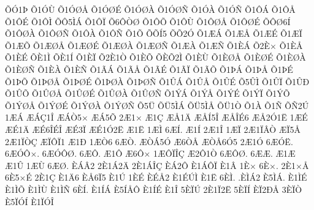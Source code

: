 {^^d5^^d31^^de
^^d51^^d3^^d9
^^d51^^d3^^d8^^c5
^^d51^^d3^^d8^^c9
^^d51^^d3^^d8^^c0
^^d51^^d3^^d8^^d1
^^d51^^d3^^c0
^^d51^^d3^^d1
^^d51^^d4^^c1
^^d51^^d4^^c5
^^d51^^d4^^c9
^^d51^^d4^^cc
^^d5^^d45^^cc^^c1
^^d51^^d4^^cf
^^d56^^d4^^d2^^d8
^^d51^^d4^^d5
^^d51^^d4^^d9
^^d51^^d4^^d8^^c5
^^d51^^d4^^d8^^c9
^^d5^^d4^^d86^^cd
^^d51^^d4^^d8^^c0
^^d51^^d4^^d8^^d1
^^d51^^d4^^c0
^^d51^^d4^^d1
^^d51^^d5
^^d5^^d5^^cd5
^^d5^^d52^^d3
^^d51^^c6^^c1
^^d51^^c6^^c5
^^d51^^c6^^c9
^^d51^^c6^^cf
^^d51^^c6^^d5
^^d51^^c6^^d8^^c5
^^d51^^c6^^d8^^c9
^^d51^^c6^^d8^^c0
^^d51^^c6^^d8^^d1
^^d51^^c6^^c0
^^d51^^c6^^d1
^^d51^^c8^^c1
^^d52^^c8^^d7
^^d51^^c8^^c5
^^d51^^c8^^c9
^^d5^^c81^^cc
^^d5^^c81^^cd
^^d51^^c8^^cf
^^d52^^c81^^d2
^^d51^^c8^^d5
^^d5^^c8^^d52^^cc
^^d51^^c8^^d9
^^d51^^c8^^d8^^c5
^^d51^^c8^^d8^^c9
^^d51^^c8^^d8^^c0
^^d51^^c8^^d8^^d1
^^d51^^c8^^c0
^^d51^^c8^^d1
^^d51^^c3^^c1
^^d51^^c3^^c5
^^d51^^c3^^c9
^^d51^^c3^^cf
^^d51^^c3^^d5
^^d51^^de^^c1
^^d51^^de^^c5
^^d51^^de^^c9
^^d51^^de^^d5
^^d51^^de^^d8^^c5
^^d51^^de^^d8^^c9
^^d51^^de^^d8^^c0
^^d51^^de^^d8^^d1
^^d51^^db^^c1
^^d51^^db^^c5
^^d51^^db^^c9
^^d55^^db^^cc
^^d51^^db^^cf
^^d51^^db^^d0
^^d51^^db^^d5
^^d51^^db^^d8^^c5
^^d51^^db^^d8^^c9
^^d51^^db^^d8^^c0
^^d51^^db^^d8^^d1
^^d51^^dd^^c1
^^d51^^dd^^c5
^^d51^^dd^^c9
^^d51^^dd^^cf
^^d51^^dd^^d5
^^d51^^dd^^d8^^c5
^^d51^^dd^^d8^^c9
^^d51^^dd^^d8^^c0
^^d51^^dd^^d8^^d1
^^d55^^dc
^^d5^^dc5^^cc^^c1
^^d5^^dc5^^cc^^c5
^^d5^^dc1^^d2
^^d51^^c0
^^d51^^d1
^^d5^^d12^^da
1^^c6^^c1
^^c6^^c1^^c71^^ce
^^c6^^c1^^d25^^d7
^^c6^^c15^^d5
2^^c61^^d7
^^c61^^c7
^^c6^^c51^^c4
^^c6^^c5^^cd5^^ce
^^c6^^c5^^ce^^c96
^^c6^^c52^^d31^^cb
1^^c6^^c9
^^c6^^c91^^c4
^^c6^^c96^^ce^^c9^^ce
^^c6^^c93^^cf
^^c6^^c91^^d32^^cb
^^c61^^cb
1^^c6^^cc
6^^c6^^cd.
^^c61^^cd
2^^c61^^ce
1^^c6^^cf
2^^c61^^cf^^c2^^d2
^^c6^^cf5^^c5
2^^c61^^cf^^d2^^c7
^^c6^^cf^^d4^^cf1
^^c61^^d0
1^^c6^^d26
6^^c6^^d2.
^^c6^^d2^^c15^^d3
^^c66^^d2^^c5
^^c6^^d2^^c56^^d35
2^^c61^^d3
6^^c6^^d3^^cb.
6^^c6^^d3^^d4^^d7.
6^^c6^^d3^^d4^^d8.
6^^c6^^d4.
^^c61^^d4
^^c66^^d4^^d7
1^^c6^^d4^^cf^^ce^^c7
^^c62^^d41^^d2
6^^c6^^d4^^d8.
6^^c6^^c6.
^^c61^^c6
^^c61^^db
1^^c6^^d9
6^^c6^^d8.
^^c8^^c1^^c22
2^^c81^^c12^^c4
2^^c81^^c1^^ce^^c7
^^c8^^c12^^d4
^^c81^^c1^^d4^^cf
^^c81^^c2
1^^c8^^d7
6^^c8^^d7.
2^^c81^^d7^^c5
6^^c85^^d7^^c9
2^^c81^^c7
^^c81^^c46
^^c8^^c56^^cf5
^^c81^^da
1^^c8^^c9
^^c8^^c9^^c52
^^c81^^c9^^da^^cc
^^c81^^cb
6^^c8^^cc.
.^^c8^^cc^^c12
^^c85^^cc^^c1.
^^c81^^cc^^c9
^^c81^^cc^^d5
^^c81^^cc^^d9
^^c81^^cc^^d1
6^^c8^^cd.
^^c81^^cd^^c1
^^c85^^cd^^c5^^d4
^^c81^^cd^^c9
^^c81^^ce
5^^c8^^cf^^da
2^^c81^^cf2^^cb
5^^c8^^cf^^cd
^^c8^^cf2^^d0^^c5
3^^c8^^cf^^d2
^^c85^^cf^^d3^^cd
^^c81^^cf^^d3^^ce
}
